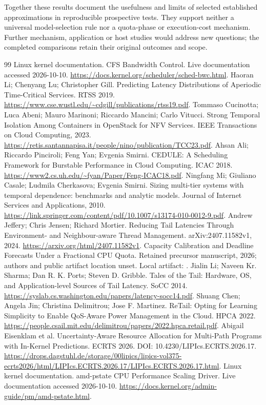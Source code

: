 \documentclass[11pt,a4paper]{article}
\begin{document}
Together these results document the usefulness and limits of selected
established approximations in reproducible prospective tests. They support
neither a universal model-selection rule nor a quota-phase or execution-cost
mechanism. Further mechanism, application or host studies would address new
questions; the completed comparisons retain their original outcomes and scope.

\begin{thebibliography}{99}
 Linux kernel documentation. CFS Bandwidth Control. Live documentation accessed 2026-10-10. \url{https://docs.kernel.org/scheduler/sched-bwc.html}.
 Haoran Li; Chenyang Lu; Christopher Gill. Predicting Latency Distributions of Aperiodic Time-Critical Services. RTSS 2019. \url{https://www.cse.wustl.edu/~cdgill/publications/rtss19.pdf}.
 Tommaso Cucinotta; Luca Abeni; Mauro Marinoni; Riccardo Mancini; Carlo Vitucci. Strong Temporal Isolation Among Containers in OpenStack for NFV Services. IEEE Transactions on Cloud Computing, 2023. \url{https://retis.santannapisa.it/people/nino/publication/TCC23.pdf}.
 Ahsan Ali; Riccardo Pinciroli; Feng Yan; Evgenia Smirni. CEDULE: A Scheduling Framework for Burstable Performance in Cloud Computing. ICAC 2018. \url{https://www2.cs.uh.edu/~fyan/Paper/Feng-ICAC18.pdf}.
 Ningfang Mi; Giuliano Casale; Ludmila Cherkasova; Evgenia Smirni. Sizing multi-tier systems with temporal dependence: benchmarks and analytic models. Journal of Internet Services and Applications, 2010. \url{https://link.springer.com/content/pdf/10.1007/s13174-010-0012-9.pdf}.
 Andrew Jeffery; Chris Jensen; Richard Mortier. Reducing Tail Latencies Through Environment- and Neighbour-aware Thread Management. arXiv:2407.11582v1, 2024. \url{https://arxiv.org/html/2407.11582v1}.
 Capacity Calibration and Deadline Forecasts Under a Fractional CPU Quota. Retained precursor manuscript, 2026; authors and public artifact location unset. Local artifact: .
 Jialin Li; Naveen Kr. Sharma; Dan R. K. Ports; Steven D. Gribble. Tales of the Tail: Hardware, OS, and Application-level Sources of Tail Latency. SoCC 2014. \url{https://syslab.cs.washington.edu/papers/latency-socc14.pdf}.
 Shuang Chen; Angela Jin; Christina Delimitrou; Jose F. Martinez. ReTail: Opting for Learning Simplicity to Enable QoS-Aware Power Management in the Cloud. HPCA 2022. \url{https://people.csail.mit.edu/delimitrou/papers/2022.hpca.retail.pdf}.
 Abigail Eisenklam et al. Uncertainty-Aware Resource Allocation for Multi-Path Programs with In-Kernel Predictions. ECRTS 2026. DOI: 10.4230/LIPIcs.ECRTS.2026.17. \url{https://drops.dagstuhl.de/storage/00lipics/lipics-vol375-ecrts2026/html/LIPIcs.ECRTS.2026.17/LIPIcs.ECRTS.2026.17.html}.
 Linux kernel documentation. amd-pstate CPU Performance Scaling Driver. Live documentation accessed 2026-10-10. \url{https://docs.kernel.org/admin-guide/pm/amd-pstate.html}.
\end{thebibliography}
\end{document}
